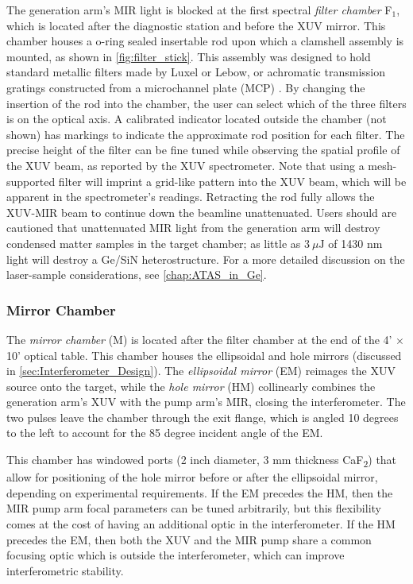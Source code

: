 The generation arm's MIR light is blocked at the first spectral \textit{filter chamber} F$_1$, which is located after the diagnostic station and before the XUV mirror. This chamber houses a o-ring sealed insertable rod upon which a clamshell assembly is mounted, as shown in \cref{fig:filter_stick}. This assembly was designed to hold standard metallic filters made by Luxel or Lebow, or achromatic transmission gratings constructed from a microchannel plate (MCP) \cite{zhangSuppressionDrivingLaser2014}. By changing the insertion of the rod into the chamber, the user can select which of the three filters is on the optical axis. A calibrated indicator located outside the chamber (not shown) has markings to indicate the approximate rod position for each filter. The precise height of the filter can be fine tuned while observing the spatial profile of the XUV beam, as reported by the XUV spectrometer. Note that using a mesh-supported filter will imprint a grid-like pattern into the XUV beam, which will be apparent in the spectrometer's readings. Retracting the rod fully allows the XUV-MIR beam to continue down the beamline unattenuated. Users should are cautioned that unattenuated MIR light from the generation arm will destroy condensed matter samples in the target chamber; as little as $3 \ \mu \textrm{J}$ of 1430 nm light will destroy a Ge/SiN heterostructure. For a more detailed discussion on the laser-sample considerations, see \cref{chap:ATAS_in_Ge}.

\subsubsection{Mirror Chamber}

The \textit{mirror chamber} (M) is located after the filter chamber at the end of the 4' $\times$ 10' optical table. This chamber houses the ellipsoidal and hole mirrors (discussed in \cref{sec:Interferometer_Design}). The \textit{ellipsoidal mirror} (EM) reimages the XUV source onto the target, while the \textit{hole mirror} (HM) collinearly combines the generation arm's XUV with the pump arm's MIR, closing the interferometer. The two pulses leave the chamber through the exit flange, which is angled 10 degrees to the left to account for the 85 degree incident angle of the EM.

This chamber has windowed ports (2 inch diameter, 3 mm thickness CaF\textsubscript{2}) that allow for positioning of the hole mirror before or after the ellipsoidal mirror, depending on experimental requirements. If the EM precedes the HM, then the MIR pump arm focal parameters can be tuned arbitrarily, but this flexibility comes at the cost of having an additional optic in the interferometer. If the HM precedes the EM, then both the XUV and the MIR pump share a common focusing optic which is outside the interferometer, which can improve interferometric stability.

